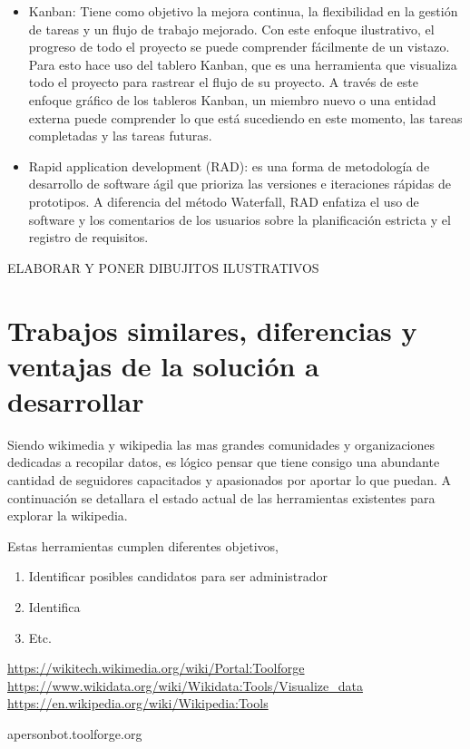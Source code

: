     \begin{itemize}
        \item Kanban: Tiene como objetivo la mejora continua, la flexibilidad en la gestión de tareas y un flujo de trabajo mejorado. Con este enfoque ilustrativo, el progreso de todo el proyecto se puede comprender fácilmente de un vistazo. Para esto hace uso del tablero Kanban, que es una herramienta que visualiza todo el proyecto para rastrear el flujo de su proyecto. A través de este enfoque gráfico de los tableros Kanban, un miembro nuevo o una entidad externa puede comprender lo que está sucediendo en este momento, las tareas completadas y las tareas futuras.
        \item Rapid application development (RAD):  es una forma de metodología de desarrollo de software ágil que prioriza las versiones e iteraciones rápidas de prototipos. A diferencia del método Waterfall, RAD enfatiza el uso de software y los comentarios de los usuarios sobre la planificación estricta y el registro de requisitos.
    \end{itemize}

    ELABORAR Y PONER DIBUJITOS ILUSTRATIVOS


\section{Trabajos similares, diferencias y ventajas de la solución a desarrollar}
Siendo wikimedia y wikipedia las mas grandes comunidades y organizaciones dedicadas a recopilar datos, es lógico pensar que tiene consigo una abundante cantidad de seguidores capacitados y apasionados por aportar lo que puedan. A continuación se detallara el estado actual de las herramientas existentes para explorar la wikipedia.

Estas herramientas cumplen diferentes objetivos, 

\begin{enumerate}
    \item Identificar posibles candidatos para ser administrador
    \item Identifica 
    \item Etc.
  \end{enumerate}


\url{https://wikitech.wikimedia.org/wiki/Portal:Toolforge}
\url{https://www.wikidata.org/wiki/Wikidata:Tools/Visualize_data}
\url{https://en.wikipedia.org/wiki/Wikipedia:Tools}

apersonbot.toolforge.org


